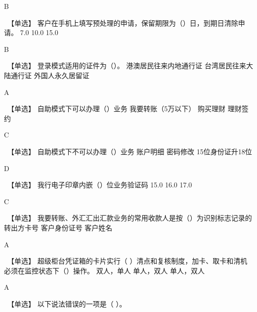 \documentclass[kindlepaper]{BHCexam4kindle}
\begin{document}
\begin{questions}
\begin{solution} B \end{solution}
\qs　【单选】 客户在手机上填写预处理的申请，保留期限为（）日，到期日清除申请。 \xx
{} {  7.0 } { 10.0 } { 15.0 }
\begin{solution} B \end{solution}
\qs　【单选】 登录模式适用的证件为（）。 \xx
{} {  港澳居民往来内地通行证 } { 台湾居民往来大陆通行证 } { 外国人永久居留证 }
\begin{solution} A \end{solution}
\qs　【单选】 自助模式下可以办理（）业务 \xx
{} {  我要转账（5万以下） } { 购买理财 } { 理财签约 }
\begin{solution} C \end{solution}
\qs　【单选】 自助模式下不可以办理（）业务 \xx
{} {  账户明细 } { 密码修改 } { 15位身份证升18位 }
\begin{solution} D \end{solution}
\qs　【单选】 我行电子印章内嵌（）位业务验证码 \xx
{} {  15.0 } { 16.0 } { 17.0 }
\begin{solution} C \end{solution}
\qs　【单选】 我要转账、外汇汇出汇款业务的常用收款人是按（）为识别标志记录的 \xx
{} {  转出方卡号 } { 客户身份证号 } { 客户姓名 }
\begin{solution} A \end{solution}
\qs　【单选】 超级柜台凭证箱的卡片实行（  ）清点和复核制度，加卡、取卡和清机必须在监控状态下（）操作。 \xx
{} {  双人，单人 } { 单人，双人 } { 单人，双人 }
\begin{solution} A \end{solution}
\qs　【单选】 以下说法错误的一项是（  ）。 \xx

\end{questions}
\end{document}
